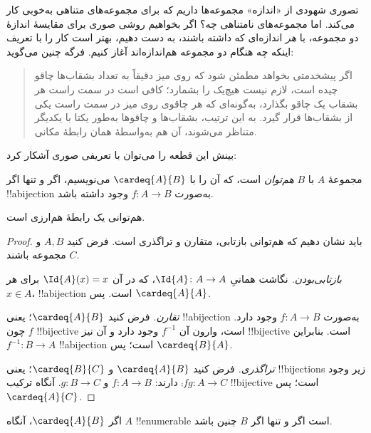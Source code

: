 \documentclass[../../../include/open-logic-section]{subfiles}
\begin{document}


تصوری شهودی از «اندازه» مجموعه‌ها داریم که برای مجموعه‌های متناهی به‌خوبی
کار می‌کند. اما مجموعه‌های نامتناهی چه؟ اگر بخواهیم روشی صوری برای
مقایسهٔ اندازهٔ دو مجموعه، با \emph{هر} اندازه‌ای که داشته باشند، به
دست دهیم، بهتر
است کار را با تعریف اینکه چه هنگام دو مجموعه هم‌اندازه‌اند آغاز کنیم.
فرگه چنین می‌گوید:
\begin{quote}
  اگر پیشخدمتی بخواهد مطمئن شود که روی میز دقیقاً به تعداد بشقاب‌ها
  چاقو چیده است، لازم نیست هیچ‌یک را بشمارد؛ کافی است در سمت راست هر
  بشقاب یک چاقو بگذارد، به‌گونه‌ای که هر چاقوی روی میز در سمت راست
  یکی از بشقاب‌ها قرار گیرد. به این ترتیب، بشقاب‌ها و چاقوها به‌طور
  یکتا با یکدیگر متناظر می‌شوند، آن هم به‌واسطهٔ همان رابطهٔ مکانی.
  \citep[\S70]{Frege1884}
\end{quote}
بینش این قطعه را می‌توان با تعریفی صوری آشکار کرد:

\begin{defn}
  مجموعهٔ $A$ با $B$ \emph{هم‌توان} است، که آن را با $\cardeq{A}{B}$
  می‌نویسیم، اگر و تنها اگر !!a{bijection} به‌صورت
  $f \colon A \to B$ وجود داشته باشد.
\end{defn}

\begin{prop}
هم‌توانی یک رابطهٔ هم‌ارزی است.
\end{prop}

\begin{proof}
باید نشان دهیم که هم‌توانی بازتابی، متقارن و تراگذری است. فرض کنید
$A, B$ و $C$ مجموعه باشند.

\emph{بازتابی‌بودن.} نگاشت همانیِ $\Id{A} \colon A \to A$، که در آن
$\Id{A} (x) = x$ برای هر $x \in A$، !!a{bijection} است. پس
$\cardeq{A}{A}$.

\emph{تقارن.} فرض کنید $\cardeq{A}{B}$؛ یعنی !!a{bijection} به‌صورت
$f\colon A \to B$ وجود دارد. چون $f$ !!{bijective} است، وارون آن
$f^{-1}$ وجود دارد و آن نیز !!{bijective} است. بنابراین
$f^{-1}\colon B \to A$ !!a{bijection} است؛ پس $\cardeq{B}{A}$.

\emph{تراگذری.} فرض کنید $\cardeq{A}{B}$ و $\cardeq{B}{C}$؛ یعنی
!!{bijection}s زیر وجود دارند: $f\colon A \to B$ و $g\colon B \to
C$. آنگاه ترکیب $\comp{f}{g}\colon A \to C$ !!{bijective}
است؛ پس $\cardeq{A}{C}$.
\end{proof}

\begin{prop}
اگر $\cardeq{A}{B}$، آنگاه $A$ !!{enumerable} است اگر
و تنها اگر $B$ چنین باشد.
\end{prop}
\end{document}
